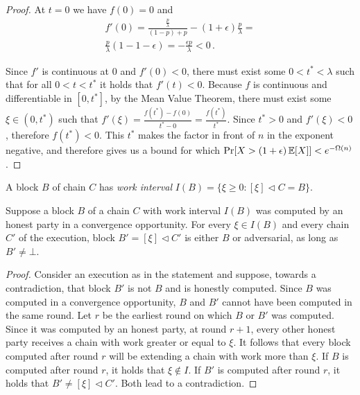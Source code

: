 \begin{proof}
  At $t = 0$ we have $f(0) = 0$ and
  \begin{align*}
    f'(0) = \frac{\frac{p}{\lambda}}{(1 - p) + p} - (1 + \epsilon)\frac{p}{\lambda} =\\
    \frac{p}{\lambda}(1 - 1 - \epsilon) = -\frac{\epsilon p}{\lambda} < 0\,.
  \end{align*}

  Since $f'$ is continuous at $0$ and $f'(0) < 0$, there must exist some $0 < t^* < \lambda$ such that for all
  $0 < t < t^*$ it holds that $f'(t) < 0$. Because $f$ is continuous and differentiable in $[0, t^*]$,
  by the Mean Value Theorem, there must exist some $\xi \in (0, t^*)$ such that
  $f'(\xi) = \frac{f(t^*) - f(0)}{t^* - 0} = \frac{f(t^*)}{t^*}$.
  Since $t^* > 0$ and $f'(\xi) < 0$, therefore $f(t^*) < 0$.
  This $t^*$ makes the factor in front of $n$ in the exponent negative, and therefore
  gives us a bound for which $\Pr[X > (1 + \epsilon)\mathop{{}\mathbb{E}}[X]] < e^{-\Omega(n)}$.
\end{proof}

\begin{definition}
  A block $B$ of chain $C$ has \emph{work interval}
  $I(B) = \{\xi \geq 0: [\xi] \lhd C = B\}$.
\end{definition}


\begin{lemma} \label{lem:pairing}
  Suppose a block $B$ of a chain $C$ with work interval $I(B)$
  was computed by an honest party in a convergence opportunity.
  For every $\xi \in I(B)$ and every chain $C'$ of the execution,
  block $B' = [\xi] \lhd C'$ is either $B$ or adversarial,
  as long as $B' \neq \bot$.
\end{lemma}
\begin{proof}
  Consider an execution as in the statement and suppose, towards a contradiction,
  that block $B'$ is not $B$ and is honestly computed.
  Since $B$ was computed in a convergence opportunity, $B$ and $B'$
  cannot have been computed in the same round. Let $r$ be the earliest round
  on which $B$ or $B'$ was computed. Since it was computed by
  an honest party, at round $r + 1$, every other honest party receives
  a chain with work greater or equal to $\xi$.
  It follows that every block computed
  after round $r$ will be extending a chain with work more than $\xi$.
  If $B$ is computed after round $r$, it holds that $\xi \not \in I$.
  If $B'$ is computed after round $r$, it holds that $B' \neq [\xi] \lhd C'$.
  Both lead to a contradiction. \Qed
\end{proof}

